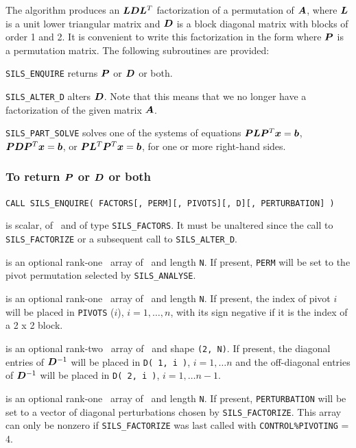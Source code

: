 \documentclass{galahad}
\newcommand{\packagename}{SILS}
\begin{document}
The algorithm produces an ${\bm{L}} {\bm{D}} {\bm{L}}^T$ factorization 
of a permutation of ${\bm{A}}$, where ${\bm{L}}$ is a unit lower triangular 
matrix and ${\bm{D}}$ is a block diagonal matrix with blocks of order 
1 and 2. It is convenient to write this factorization in the form 
where ${\bm{P}}$ is a permutation matrix. The following subroutines 
are provided: 
\begin{description} 
\ittf{} {\tt \packagename\_ENQUIRE} returns ${\bm{P}}$ or ${\bm{D}}$ or both. 
 
\ittf{} {\tt \packagename\_ALTER\_D} alters ${\bm{D}}$. Note that this means that 
we no longer have a factorization of the given matrix ${\bm{A}}$. 
 
\ittf{} {\tt \packagename\_PART\_SOLVE} solves one of the systems of equations 
${\bm{P}} {\bm{L}} {\bm{P}}^T {\bm{x}} =  {\bm{b}}$,  
${\bm{P}} {\bm{D}} {\bm{P}}^T {\bm{x}} =  {\bm{b}}$, or 
${\bm{P}} {\bm{L}}^T {\bm{P}}^T {\bm{x}} =  {\bm{b}}$, 
for one or more right-hand sides. 
 
\end{description} 
 
\subsubsection{To return ${\bm{P}}$ or ${\bm{D}}$ or both}
 
\hskip0.5in 
{\tt CALL \packagename\_ENQUIRE( FACTORS[, PERM][, PIVOTS][, D][, PERTURBATION] )}
 
\begin{description} 
 is scalar, of \intentin\ and of type {\tt \packagename\_FACTORS}.
It must be unaltered since the call to {\tt \packagename\_FACTORIZE} 
or a subsequent call to {\tt \packagename\_ALTER\_D}. 
 
 is an optional rank-one \integer\ array of \intentout\
 and length {\tt N}.
If present, {\tt PERM} will be set to the pivot permutation
selected by {\tt \packagename\_ANALYSE}.
  
 is an optional rank-one \integer\ array of \intentout\
 and length {\tt N}.
If present, the index of pivot $i$ will be placed in 
{\tt PIVOTS} ($i$), $i = 1, \ldots, n$, with its sign negative if it is 
the index of a 2 x 2 block. 
  
 is an optional rank-two \realdp\ array
of \intentout\, and shape {\tt (2, N)}.
If present, the diagonal entries of ${\bm{D}}^{-1} $ will 
be placed in {\tt D( 1, i )}, $i = 1, \ldots n$ and the off-diagonal 
entries of ${\bm{D}}^{-1} $ will be placed in {\tt D( 2, i )}, 
$i = 1, \ldots n-1$. 

 is an optional rank-one \realdp\ array of 
\intentout\ and length {\tt N}.
If present, {\tt PERTURBATION} will be set to a vector of diagonal perturbations
chosen by {\tt \packagename\_FACTORIZE}. This array can only be nonzero if
{\tt \packagename\_FACTORIZE} was last called with {\tt CONTROL\%PIVOTING} = 4.

\end{description} 
 
\end{document}
